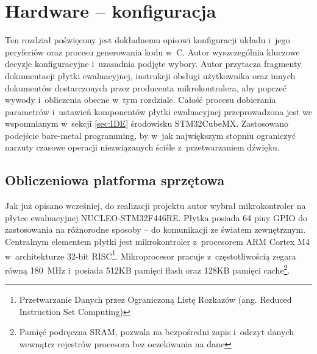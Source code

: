 \chapter{Hardware -- konfiguracja}
Ten rozdział poświęcony jest dokładnemu opisowi konfiguracji układu i~jego peryferiów oraz procesu generowania kodu w~C. Autor wyszczególnia kluczowe decyzje konfiguracyjne i~uzasadnia podjęte wybory. Autor przytacza fragmenty dokumentacji płytki ewaluacyjnej, instrukcji obsługi użytkownika oraz innych dokumentów dostarczonych przez producenta mikrokontrolera, aby poprzeć wywody i~obliczenia obecne w~tym rozdziale. Całość procesu dobierania parametrów i~ustawień komponentów płytki ewaluacyjnej przeprowadzona jest we wspomnianym w~sekcji \ref{sec:IDE} środowisku STM32CubeMX. Zastosowano podejście bare-metal programming, by w~jak największym stopniu ograniczyć narzuty czasowe operacji niezwiązanych ściśle z~przetwarzaniem dźwięku.
\section{Obliczeniowa platforma sprzętowa}
Jak już opisano wcześniej, do realizacji projektu autor wybrał mikrokontroler na płytce ewaluacyjnej NUCLEO-STM32F446RE. Płytka posiada 64 piny GPIO do zastosowania na różnorodne sposoby -- do komunikacji ze światem zewnętrznym. Centralnym elementem płytki jest mikrokontroler z~procesorem ARM Cortex M4 w~architekturze 32-bit RISC\footnote{Przetwarzanie Danych przez Ograniczoną Listę Rozkazów (ang. Reduced Instruction Set Computing)}. Mikroprocesor pracuje z~częstotliwością zegara równą \SI{180}{\MHz} i~posiada 512KB pamięci flash oraz 128KB pamięci cache\footnote{Pamięć podręczna SRAM, pozwala na bezpośredni zapis i~odczyt danych wewnątrz rejestrów procesora bez oczekiwania na dane}.

